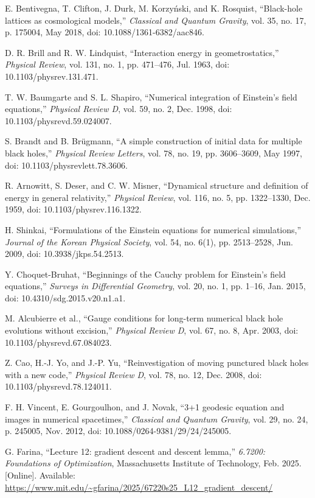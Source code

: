 \documentclass[conference]{IEEEtran}
\begin{document}
\begin{thebibliography}{00}
E. Bentivegna, T. Clifton, J. Durk, M. Korzyński, and K. Rosquist, ``Black-hole lattices as cosmological models,'' \textit{Classical and Quantum Gravity}, vol. 35, no. 17, p. 175004, May 2018, doi: 10.1088/1361-6382/aac846.

D. R. Brill and R. W. Lindquist, ``Interaction energy in geometrostatics,'' \textit{Physical Review}, vol. 131, no. 1, pp. 471--476, Jul. 1963, doi: 10.1103/physrev.131.471.

T. W. Baumgarte and S. L. Shapiro, ``Numerical integration of Einstein’s field equations,'' \textit{Physical Review D}, vol. 59, no. 2, Dec. 1998, doi: 10.1103/physrevd.59.024007.

S. Brandt and B. Brügmann, ``A simple construction of initial data for multiple black holes,'' \textit{Physical Review Letters}, vol. 78, no. 19, pp. 3606--3609, May 1997, doi: 10.1103/physrevlett.78.3606.

R. Arnowitt, S. Deser, and C. W. Misner, ``Dynamical structure and definition of energy in general relativity,'' \textit{Physical Review}, vol. 116, no. 5, pp. 1322--1330, Dec. 1959, doi: 10.1103/physrev.116.1322.

H. Shinkai, ``Formulations of the Einstein equations for numerical simulations,'' \textit{Journal of the Korean Physical Society}, vol. 54, no. 6(1), pp. 2513--2528, Jun. 2009, doi: 10.3938/jkps.54.2513.

Y. Choquet-Bruhat, ``Beginnings of the Cauchy problem for Einstein’s field equations,'' \textit{Surveys in Differential Geometry}, vol. 20, no. 1, pp. 1--16, Jan. 2015, doi: 10.4310/sdg.2015.v20.n1.a1.

M. Alcubierre et al., ``Gauge conditions for long-term numerical black hole evolutions without excision,'' \textit{Physical Review D}, vol. 67, no. 8, Apr. 2003, doi: 10.1103/physrevd.67.084023.

Z. Cao, H.-J. Yo, and J.-P. Yu, ``Reinvestigation of moving punctured black holes with a new code,'' \textit{Physical Review D}, vol. 78, no. 12, Dec. 2008, doi: 10.1103/physrevd.78.124011.

F. H. Vincent, E. Gourgoulhon, and J. Novak, ``3+1 geodesic equation and images in numerical spacetimes,'' \textit{Classical and Quantum Gravity}, vol. 29, no. 24, p. 245005, Nov. 2012, doi: 10.1088/0264-9381/29/24/245005.

G. Farina, ``Lecture 12: gradient descent and descent lemma,'' \textit{6.7200: Foundations of Optimization}, Massachusetts Institute of Technology, Feb. 2025. [Online]. Available: \url{https://www.mit.edu/~gfarina/2025/67220s25_L12_gradient_descent/}


\end{thebibliography}
\end{document}
